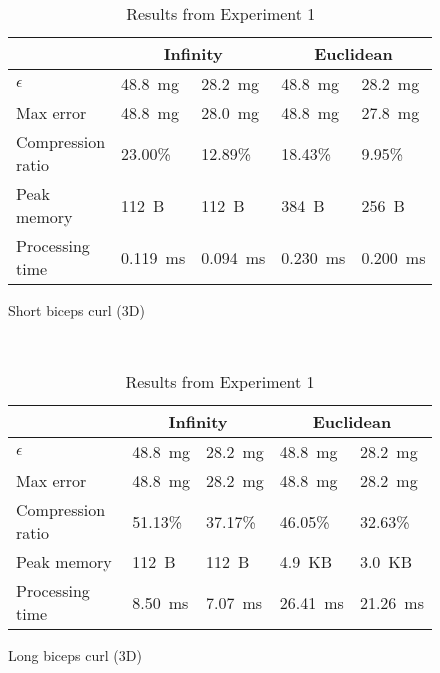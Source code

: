 \documentclass[10pt, conference, compsocconf]{IEEEtran}
\begin{document}
\begin{table}
\begin{subfigure}{\columnwidth}
\begin{tabular}{l|l|l|l|l}
    \hline
    \rowcolor{headcolor}
                            & \multicolumn{2}{c|}{Infinity} & \multicolumn{2}{c}{Euclidean} \\ \hline
    $\epsilon$             & 48.8~mg          & 28.2~mg  & 48.8~mg         & 28.2~mg   \\
    Max error              & 48.8~mg       & 28.0~mg           & 48.8~mg       & 27.8~mg            \\
    Compression ratio      & 23.00\%      & 12.89\%         & 18.43\%     & 9.95\%           \\
    Peak memory            & 112~B         & 112~B            & 384~B        & 256~B             \\
    Processing time        & 0.119~ms      & 0.094~ms         & 0.230~ms     & 0.200~ms          \\ \hline
    \end{tabular}
    \caption{Short biceps curl (3D)}
    \end{subfigure}\\
    \begin{subfigure}{\columnwidth}
    \centering
    \begin{tabular}{l|l|l|l|l}
    \hline
    \rowcolor{headcolor}
                              & \multicolumn{2}{c|}{Infinity} & \multicolumn{2}{c}{Euclidean} \\ \hline
    $\epsilon$                & 48.8~mg        & 28.2~mg    & 48.8~mg        & 28.2~mg    \\
    Max error                 & 48.8~mg     & 28.2~mg             & 48.8~mg      & 28.2~mg             \\
    Compression ratio         & 51.13\%    & 37.17\%           & 46.05\%    & 32.63\%           \\
    Peak memory & 112~B        & 112~B              & 4.9~KB      & 3.0~KB             \\
    Processing time           & 8.50~ms     & 7.07~ms            & 26.41~ms    & 21.26~ms           \\ \hline
    \end{tabular}
    \caption{Long biceps curl (3D)}
    \end{subfigure}
    \caption{Results from Experiment 1}
    \label{table:results-validation}
\end{table}
\end{document}
